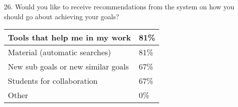 26. Would you like to receive recommendations from the system on how you should go about achieving your goals?

\begin{center}
    \begin{tabular}{ | l | l | }
    \hline
    Tools that help me in my work & 81\% \\ \hline
	Material (automatic searches) & 81\% \\ \hline
	New sub goals or new similar goals & 67\% \\ \hline
	Students for collaboration & 67\% \\ \hline
	Other & 0\% \\ \hline
    \end{tabular}
\end{center}
